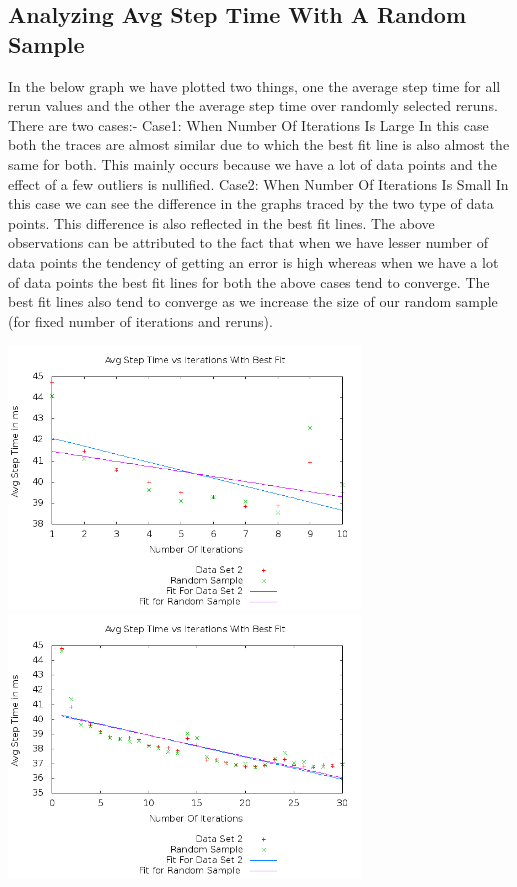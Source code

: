 \documentclass[11pt]{article}
\begin{document}
	\subsection{Analyzing Avg Step Time With A Random Sample}
	In the below graph we have plotted two things, one the average step time for all rerun values and the other the average step time over randomly selected reruns. There are two cases:-\newline
	Case1: When Number Of Iterations Is Large\newline
	In this case both the traces are almost similar due to which the best fit line is also almost the same for both. This mainly occurs because we have a lot of data points and the effect of a few outliers is nullified.\newline
	Case2: When Number Of Iterations Is Small\newline
	In this case we can see the difference in the graphs traced by the two type of data points. This difference is also reflected in the best fit lines.\newline
The above observations can be attributed to the fact that when we have lesser number of data points the tendency of getting an error is high whereas when we have a lot of data points the best fit lines for both the above cases tend to converge. The best fit lines also tend to converge as we increase the size of our random sample (for fixed number of iterations and reruns).
	
	\begin{center}\includegraphics[height=7cm]{10_10_plot05.png}\includegraphics[height=7cm]{30_60_plot05.png}\end{center}
	
\end{document}
